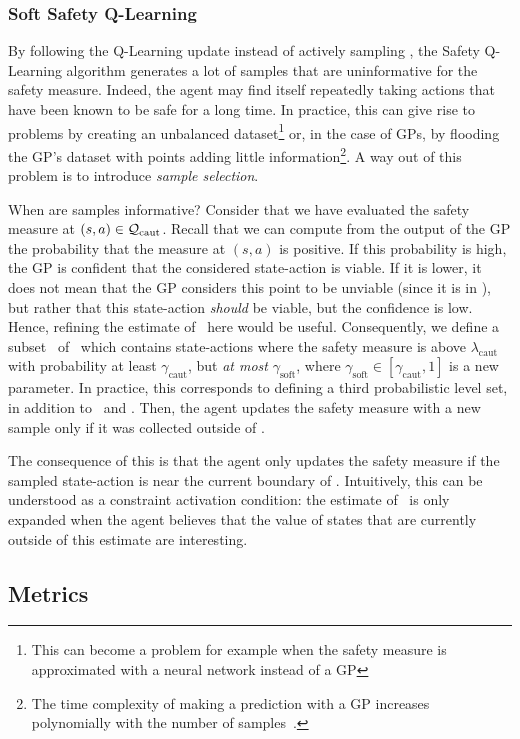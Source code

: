 \subsubsection{Soft Safety Q-Learning}
By following the Q-Learning update instead of actively sampling \LQhat, the Safety Q-Learning algorithm generates a lot of samples that are uninformative for the safety measure. Indeed, the agent may find itself repeatedly taking actions that have been known to be safe for a long time. In practice, this can give rise to problems by creating an unbalanced dataset\footnote{This can become a problem for example when the safety measure is approximated with a neural network instead of a GP} or, in the case of GPs, by flooding the GP's dataset with points adding little information\footnote{The time complexity of making a prediction with a GP increases polynomially with the number of samples~\cite{williams2006gaussian}.}. A way out of this problem is to introduce\emph{ sample selection}. \par
When are samples informative? Consider that we have evaluated the safety measure at $(s, a)\in\mathcal{Q}_\text{caut}$. Recall that we can compute from the output of the GP the probability that the measure at $(s, a)$ is positive. If this probability is high, the GP is confident that the considered state-action is viable. If it is lower, it does not mean that the GP considers this point to be unviable (since it is in \Qcaut), but rather that this state-action\emph{ should} be viable, but the confidence is low. Hence, refining the estimate of \LQhat~here would be useful. Consequently, we define a subset \Qsoft~of \Qcaut~which contains state-actions where the safety measure is above $\lambda_\text{caut}$ with probability at least $\gamma_\text{caut}$, but\emph{ at most} $\gamma_\text{soft}$, where $\gamma_\text{soft}\in[\gamma_\text{caut}, 1]$ is a new parameter. In practice, this corresponds to defining a third probabilistic level set, in addition to \Qcaut~and \Qopt. Then, the agent updates the safety measure with a new sample only if it was collected outside of \Qsoft.\par
The consequence of this is that the agent only updates the safety measure if the sampled state-action is near the current boundary of \Qcaut. Intuitively, this can be understood as a constraint activation condition: the estimate of \QV~is only expanded when the agent believes that the value of states that are currently outside of this estimate are interesting. 

\subsection{Metrics} \label{sec:metrics}
